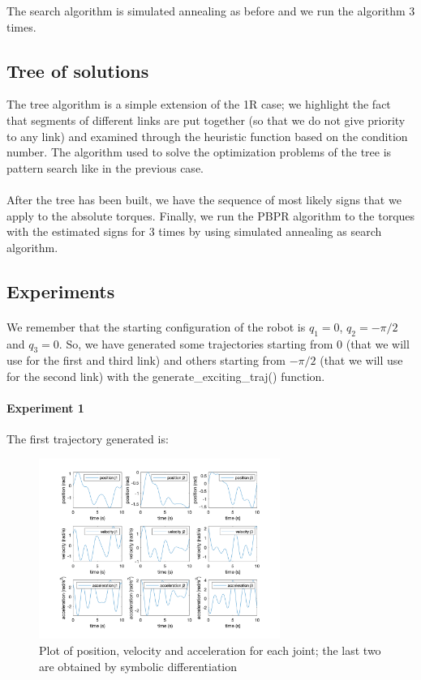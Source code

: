 \documentclass{article}
\begin{document}
The search algorithm is simulated annealing as before and we run the algorithm 3 times.

\subsection{Tree of solutions}
The tree algorithm is a simple extension of the 1R case; we highlight the fact that segments of different links are put together (so that we do not give priority to any link) and examined through the heuristic function based on the condition number. The algorithm used to solve the optimization problems of the tree is pattern search like in the previous case.
\\\\
After the tree has been built, we have the sequence of most likely signs that we apply to the absolute torques. Finally, we run the PBPR algorithm to the torques with the estimated signs for 3 times by using simulated annealing as search algorithm.

\subsection{Experiments}
\paragraph{}We remember that the starting configuration of the robot is $q_1 = 0$, $q_2 = -\pi/2$ and $q_3 = 0$. So, we have generated some trajectories starting from 0 (that we will use for the first and third link) and others starting from $-\pi/2$ (that we will use for the second link) with the generate\_exciting\_traj() function.

\paragraph{Experiment 1}
The first trajectory generated is:
\begin{figure}[!htbp]
\centering
\includegraphics[width=0.7\textwidth]{images/3-dof/trajectory123.png}
\caption{Plot of position, velocity and acceleration for each joint; the last two are obtained by symbolic differentiation}
\end{figure}
\end{document}
